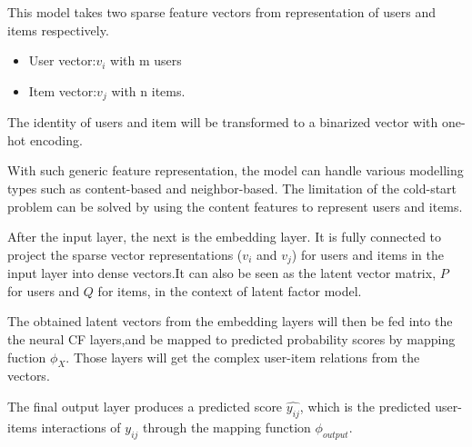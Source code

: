 \documentclass[final]{cvpr}
\begin{document}

This model takes two sparse feature vectors from representation of users and items respectively. 

\begin{itemize}
	\item User vector:$v_i$ with m users 
	\item Item vector:$v_j$ with n items.

\end{itemize}
The identity of users and item will be transformed to a binarized vector with one-hot encoding. 

With such generic feature representation, the model can handle various modelling types such as content-based and neighbor-based. The limitation of the cold-start problem can be solved by using the content features to represent users and items.


After the input layer, the next is the embedding layer. It is fully connected to project the sparse vector representations ($v_i$ and $v_j$) for users and items in the input layer into dense vectors.It can also be seen as the latent vector matrix, $P$ for users and $Q$ for items, in the context of latent factor model.


The obtained latent vectors from the embedding layers will then be fed into the the neural CF layers,and be mapped to predicted probability scores by mapping fuction $\phi_X$. Those layers will get the complex user-item relations from the vectors.


The final output layer produces a predicted score $\hat{y_{ij}}$, which is the predicted user-items interactions of $y_{ij}$ through the mapping function $\phi_{output}$.
\end{document}
